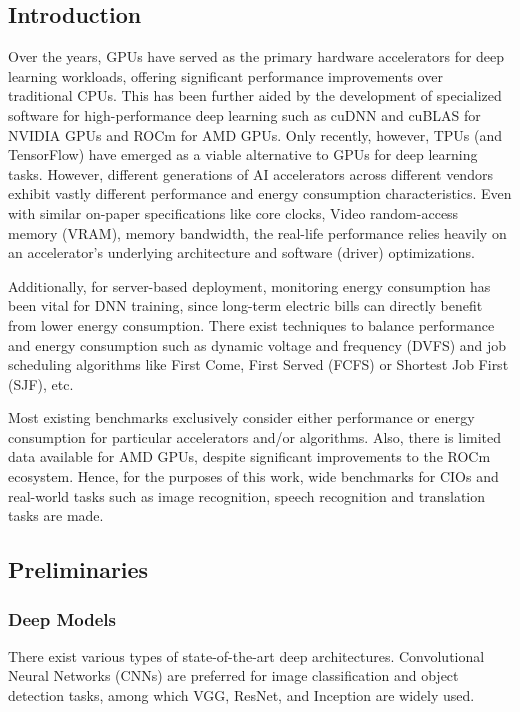 \subsection{Introduction}
\label{subsec:introduction3}

Over the years, GPUs have served as the primary hardware accelerators for deep learning workloads,
offering significant performance improvements over traditional CPUs.
This has been further aided by the development of specialized software for high-performance deep learning such as cuDNN and cuBLAS for NVIDIA GPUs and ROCm for AMD GPUs.
Only recently, however, TPUs (and TensorFlow) have emerged as a viable alternative to GPUs for deep learning tasks.
However,
different generations of AI accelerators across different vendors exhibit vastly different performance and energy consumption characteristics.
Even with similar on-paper specifications like core clocks, Video random-access memory (VRAM), memory bandwidth,
the real-life performance relies heavily on an accelerator's underlying architecture and
software (driver) optimizations.

Additionally, for server-based deployment,
monitoring energy consumption has been vital for DNN training,
since long-term electric bills can directly benefit from lower energy consumption.
There exist techniques to balance performance and energy consumption such as dynamic voltage and frequency
(DVFS)\cite{b1} and job scheduling algorithms like First Come, First Served (FCFS) or Shortest Job First (SJF)\cite{b2}, etc.

Most existing benchmarks exclusively consider either performance or energy consumption for particular accelerators and/or algorithms.
Also, there is limited data available for AMD GPUs, despite significant improvements to the ROCm ecosystem.
Hence, for the purposes of this work,
wide benchmarks for CIOs and real-world tasks such as image recognition,
speech recognition and translation tasks are made.

\subsection{Preliminaries}
\label{subsec:prelims}
\subsubsection{Deep Models}
There exist various types of state-of-the-art deep architectures.
Convolutional Neural Networks (CNNs) are preferred for image classification and object detection tasks,
among which VGG, ResNet, and Inception are widely used.

